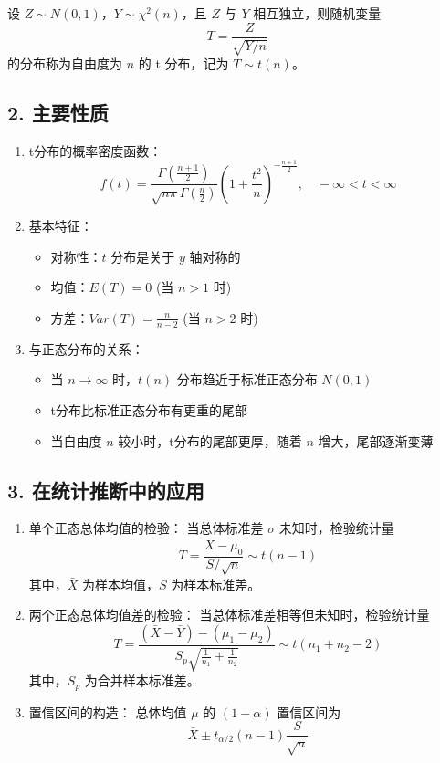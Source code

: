\documentclass[UTF8]{report}
\theoremstyle{MyLineTheoremStyle} %
\theoremstyle{MyBlockTheoremStyle} %
\theoremstyle{MySubsubsectionStyle} %
\begin{document}
设 $Z \sim N(0,1)$，$Y \sim \chi^2(n)$，且 $Z$ 与 $Y$ 相互独立，则随机变量
$$T = \frac{Z}{\sqrt{Y/n}}$$
的分布称为自由度为 $n$ 的 t 分布，记为 $T \sim t(n)$。

\subsection*{2. 主要性质}

\begin{enumerate}
\item t分布的概率密度函数：
$$f(t) = \frac{\Gamma(\frac{n+1}{2})}{\sqrt{n\pi}\Gamma(\frac{n}{2})}(1+\frac{t^2}{n})^{-\frac{n+1}{2}}, \quad -\infty < t < \infty$$

\item 基本特征：
   \begin{itemize}
   \item 对称性：$t$ 分布是关于 $y$ 轴对称的
   \item 均值：$E(T) = 0$ (当 $n > 1$ 时)
   \item 方差：$Var(T) = \frac{n}{n-2}$ (当 $n > 2$ 时)
   \end{itemize}

\item 与正态分布的关系：
   \begin{itemize}
   \item 当 $n \to \infty$ 时，$t(n)$ 分布趋近于标准正态分布 $N(0,1)$
   \item t分布比标准正态分布有更重的尾部
   \item 当自由度 $n$ 较小时，t分布的尾部更厚，随着 $n$ 增大，尾部逐渐变薄
   \end{itemize}
\end{enumerate}

\subsection*{3. 在统计推断中的应用}

\begin{enumerate}
\item 单个正态总体均值的检验：
当总体标准差 $\sigma$ 未知时，检验统计量
$$T = \frac{\bar{X} - \mu_0}{S/\sqrt{n}} \sim t(n-1)$$
其中，$\bar{X}$ 为样本均值，$S$ 为样本标准差。

\item 两个正态总体均值差的检验：
当总体标准差相等但未知时，检验统计量
$$T = \frac{(\bar{X} - \bar{Y}) - (\mu_1 - \mu_2)}{S_p\sqrt{\frac{1}{n_1}+\frac{1}{n_2}}} \sim t(n_1+n_2-2)$$
其中，$S_p$ 为合并样本标准差。

\item 置信区间的构造：
总体均值 $\mu$ 的 $(1-\alpha)$ 置信区间为
$$\bar{X} \pm t_{\alpha/2}(n-1)\frac{S}{\sqrt{n}}$$
\end{enumerate}
\end{document}
